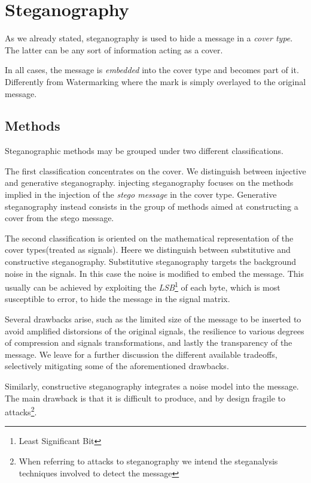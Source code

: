 \documentclass[../../main.tex]{subfiles}
\begin{document}
\section{Steganography}

As we already stated, steganography is used to hide a message in a
\emph{cover type}. The latter can be any sort of information acting as a cover.

In all cases, the message is \emph{embedded} into the cover type and becomes part of it. Differently from
Watermarking where the mark is simply overlayed to the original message.

\subsection{Methods}

Steganographic methods may be grouped under two different classifications.

The first classification concentrates on the cover. We distinguish between injective and generative steganography.
injecting steganography focuses on the methods implied in the injection of the \emph{stego message} in the cover type.
Generative steganography instead consists in the group of methods aimed at constructing a cover from the stego message.

The second classification is oriented on the mathematical representation of the cover types(treated as signals). Heere we distinguish between 
substitutive and constructive steganography.
Substitutive steganography targets the background noise in the signals. In this case the noise is modified to embed the message.
This usually can be achieved by exploiting the \emph{LSB}\footnote{Least Significant Bit} of each byte,
which is most susceptible to error, to hide the message in the signal matrix.

Several drawbacks arise, such as the limited size of the message to be inserted
to avoid amplified distorsions of the original signals, the resilience to
various degrees of compression and signals transformations, and lastly the
transparency of the message.
We leave for a further discussion the different available tradeoffs, selectively
mitigating some of the aforementioned drawbacks. 

Similarly, constructive steganography integrates a noise model into the message.
The main drawback is that it is difficult to produce, and by design fragile to
attacks\footnote{When referring to attacks to steganography we intend the steganalysis techniques involved to detect the message}.
\end{document}
